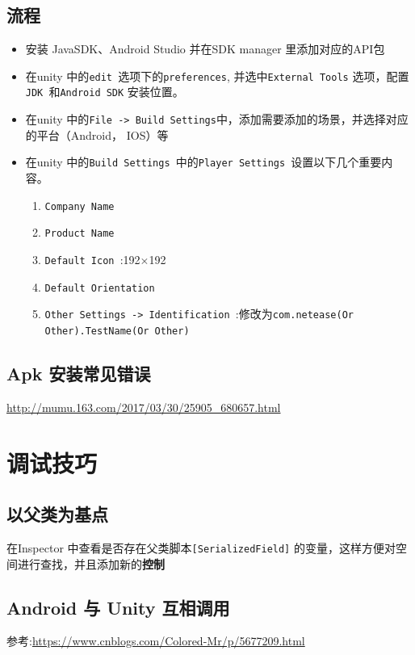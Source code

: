 \documentclass[UTF8,a4paper,12pt]{ctexbook}
\begin{document}
	\section{流程}
		\begin{itemize}
			\item 安装 JavaSDK、Android Studio 并在SDK manager 里添加对应的API包
			\item 在unity 中的\verb|edit |选项下的\verb|preferences|, 并选中\verb|External Tools| 选项，配置\verb|JDK |和\verb|Android SDK| 安装位置。
			\item 在unity 中的\verb|File -> Build Settings|中，添加需要添加的场景，并选择对应的平台（Android， IOS）等
			\item 在unity 中的\verb|Build Settings |中的\verb|Player Settings |设置以下几个重要内容。
				\begin{enumerate}
					\item \verb|Company Name |
					\item \verb|Product Name |
					\item \verb|Default Icon |:192$\times$192
					\item \verb|Default Orientation |
					\item \verb|Other Settings -> Identification |:修改为\verb|com.netease(Or Other).TestName(Or Other)|
				\end{enumerate}
		\end{itemize}	
	
	\section{Apk 安装常见错误}
		\url{http://mumu.163.com/2017/03/30/25905_680657.html}


\chapter{调试技巧}
	\section{以父类为基点}
		在Inspector 中查看是否存在父类脚本\verb|[SerializedField]| 的变量，这样方便对空间进行查找，并且添加新的\textbf{控制}			
	
	
	\section{Android 与 Unity 互相调用}
		参考:\url{https://www.cnblogs.com/Colored-Mr/p/5677209.html}
\end{document}
